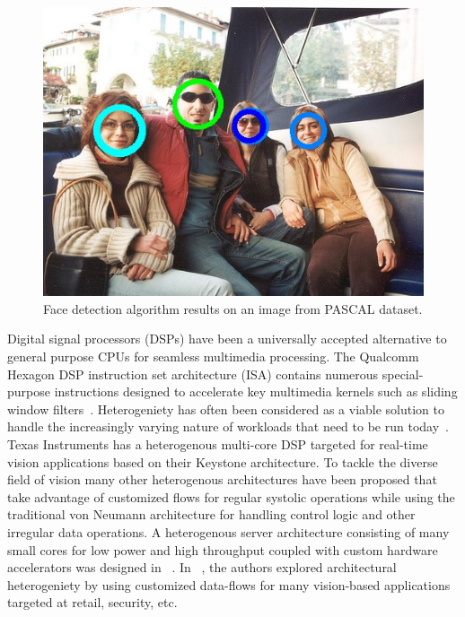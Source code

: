 \begin{figure}[htb!]
\vspace{0pt}
\centering
\includegraphics[width=0.9\linewidth]{./figures/facedetected.jpg}
\vspace{0pt}
\caption{Face detection algorithm results on an image from PASCAL dataset.}\label{fig:opencv_face_detection}
\vspace{0pt}
\end{figure}

Digital signal processors (DSPs) have been a universally accepted alternative to general purpose CPUs for seamless multimedia processing. 
The Qualcomm Hexagon DSP instruction set architecture (ISA) contains numerous special-purpose instructions designed to accelerate key multimedia kernels such as 
sliding window filters~\cite{hexagon}. 
Heterogeniety has often been considered as a viable solution to handle the increasingly varying nature of workloads that need to be run today~\cite{micro2010}.
Texas Instruments has a heterogenous multi-core DSP targeted for real-time vision applications based on their Keystone architecture. 
To tackle the diverse field of vision many other heterogenous architectures have been proposed that take advantage of 
customized flows for regular systolic operations while
using the traditional von Neumann architecture for handling control logic and other irregular data operations. A heterogenous server architecture consisting of 
many small cores for low power and high throughput coupled with custom hardware accelerators was designed in ~\cite{Iyer2011}.
In ~\cite{HPCA2015}, the authors explored architectural heterogeniety by using customized data-flows for many vision-based applications targeted at retail, 
security, etc.

